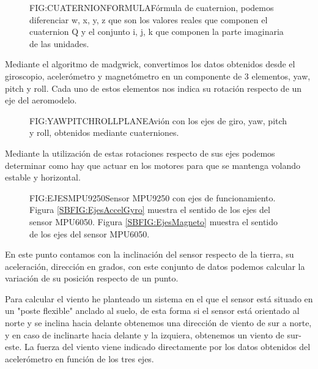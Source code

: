 \begin{figure}{FIG:CUATERNIONFORMULA}{Fórmula de cuaternion, podemos diferenciar w, x, y, z que son los valores reales que componen el cuaternion Q y el conjunto i, j, k que componen la parte imaginaria de las unidades. }
\end{figure}

   Mediante el algoritmo de madgwick, convertimos los datos obtenidos desde el giroscopio, acelerómetro y magnetómetro en un componente de 3 elementos, yaw, pitch y roll.
   Cada uno de estos elementos nos indica su rotación respecto de un eje del aeromodelo. 
 

\begin{figure}{FIG:YAWPITCHROLLPLANE}{Avión con los ejes de giro, yaw, pitch y roll, obtenidos mediante cuaterniones.}
\end{figure}
 
 Mediante la utilización de estas rotaciones respecto de sus ejes podemos determinar como hay que actuar en los motores para que se mantenga volando estable y horizontal.
  

\begin{figure}[Ejes MPU9250]{FIG:EJESMPU9250}{Sensor MPU9250 con ejes de funcionamiento. Figura \ref{SBFIG:EjesAccelGyro} muestra el sentido de los ejes del sensor MPU6050. Figura \ref{SBFIG:EjesMagneto} muestra el sentido de los ejes del sensor MPU6050.}
   \quad
\end{figure} 

 
 En este punto contamos con la inclinación del sensor respecto de la tierra, su aceleración, dirección en grados, con este conjunto de datos podemos calcular la variación de su posición respecto de un punto.
 

  
  Para calcular el viento he planteado un sistema en el que el sensor está situado en un "poste flexible" anclado al suelo, de esta forma si el sensor está orientado al norte y se inclina hacia delante obtenemos una dirección de viento de sur a norte, y en caso de inclinarte hacia delante y la izquiera, obtenemos un viento de sur-este. La fuerza del viento viene indicado directamente por los datos obtenidos del acelerómetro en función de los tres ejes.
  
  